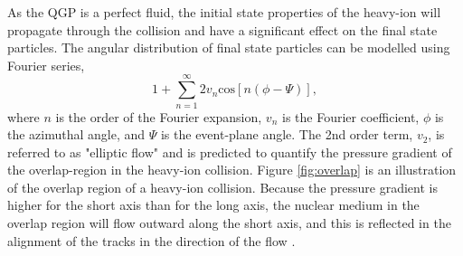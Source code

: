 As the QGP is a perfect fluid, the initial state properties of the heavy-ion will propagate through the collision and have a significant effect on the final state particles. The angular distribution of final state particles can be modelled using Fourier series,
\begin{equation}
 1+\sum^{\infty}_{n=1}2v_{n}\mathrm{cos}\left[n\left(\phi-\Psi\right)\right],
\end{equation}
where $n$ is the order of the Fourier expansion, $v_n$ is the Fourier coefficient, $\phi$ is the azimuthal angle, and $\Psi$ is the event-plane angle. The 2nd order term, $v_2$, is referred to as "elliptic flow" and is predicted to quantify the pressure gradient of the overlap-region in the heavy-ion collision. Figure \ref{fig:overlap} is an illustration of the overlap region of a heavy-ion collision. Because the pressure gradient is higher for the short axis than for the long axis, the nuclear medium in the overlap region will flow outward along the short axis, and this is reflected in the alignment of the tracks in the direction of the flow \cite{Abelev:2012ola,Ollitrault:1992bk,Sorensen:2009cz,Bhalerao:2003yq,Borghini:2001zr,Ackermann:2000tr,Borghini:2004ke}. 

